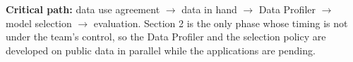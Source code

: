 \documentclass[11pt]{article}
\begin{document}
\begin{center}
\begin{ganttchart}
\end{ganttchart}

\vspace{4mm}
{\footnotesize\color{cGrey}
\textbf{Critical path:} data use agreement $\rightarrow$ data in hand $\rightarrow$ Data
Profiler $\rightarrow$ model selection $\rightarrow$ evaluation.
Section 2 is the only phase whose timing is not under the team's control, so the
Data Profiler and the selection policy are developed on public data in parallel
while the applications are pending.}

\end{center}
\end{document}
